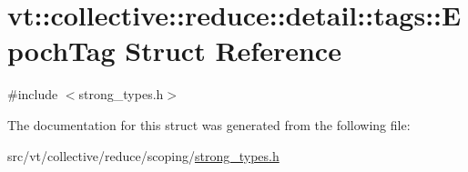 \hypertarget{structvt_1_1collective_1_1reduce_1_1detail_1_1tags_1_1_epoch_tag}{}\section{vt\+:\+:collective\+:\+:reduce\+:\+:detail\+:\+:tags\+:\+:Epoch\+Tag Struct Reference}
\label{structvt_1_1collective_1_1reduce_1_1detail_1_1tags_1_1_epoch_tag}


{\ttfamily \#include $<$strong\+\_\+types.\+h$>$}



The documentation for this struct was generated from the following file\+:\begin{DoxyCompactItemize}
\item 
src/vt/collective/reduce/scoping/\hyperlink{strong__types_8h}{strong\+\_\+types.\+h}\end{DoxyCompactItemize}
